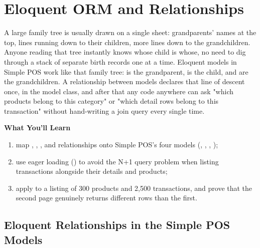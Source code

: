 
\chapter{Eloquent ORM and Relationships}
\label{ch:eloquent-dan-relasi}


A large family tree is usually drawn on a single sheet: grandparents'
names at the top, lines running down to their children, more lines down
to the grandchildren. Anyone reading that tree instantly knows whose
child is whose, no need to dig through a stack of separate birth
records one at a time. Eloquent models in Simple POS work like that
family tree:  is the grandparent, 
is the child,  and 
are the grandchildren. A relationship between models declares that line
of descent once, in the model class, and after that any code anywhere
can ask "which products belong to this category" or "which detail rows
belong to this transaction" without hand-writing a join query every
single time.

\textbf{What You'll Learn}

\begin{enumerate}
  \item map , , , and  relationships onto Simple POS's four models (, , , );
  \item use eager loading () to avoid the N+1 query problem when listing transactions alongside their details and products;
  \item apply  to a listing of 300 products and 2,500 transactions, and prove that the second page genuinely returns different rows than the first.
\end{enumerate}

\section{Eloquent Relationships in the Simple POS Models}
\label{sec:eloquent-dan-relasi-1}

